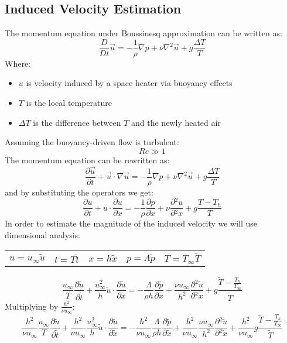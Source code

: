 \documentclass[11pt, a4paper]{article}
\newcommand{\parder}[2]{\frac{\partial {#1}}{\partial {#2}}}
\begin{document}
\subsection{Induced Velocity Estimation}
The momentum equation under Boussinesq approximation can be written as:
\begin{equation}
    \frac{D}{Dt}\vec{u}=-\frac{1}{\rho}\nabla p+\nu\nabla^2\vec{u}+g\frac{\Delta T}{T}
\end{equation}
Where:
\begin{itemize}
    \item $u$ is velocity induced by a space heater via buoyancy effects
    \item $T$ is the local temperature
    \item $\Delta T$ is the difference between $T$ and the newly heated air
\end{itemize}
Assuming the buoyancy-driven flow is turbulent:
\begin{equation*}
    Re\gg1
\end{equation*}
The momentum equation can be rewritten as:
\begin{equation*}
    \parder{\vec{u}}{t}+\vec{u}\cdot\nabla\vec{u}=-\frac{1}{\rho}\nabla p+\nu\nabla^2\vec{u}+g\frac{\Delta T}{T}
\end{equation*}
and by substituting the operators we get:
\begin{equation}
    \parder{u}{t}+u\cdot\parder{u}{x}=-\frac{1}{\rho}\parder{p}{x}+\nu\parder{^2u}{^2x}+g\frac{T-T_h}{T}
\end{equation}
In order to estimate the magnitude of the induced velocity we will use dimensional analysis:
\begin{table}[H]
    \center
    \begin{tabular}{c|c|c|c|c}
        $u=u_\infty\tilde{u}$ & $t=T\tilde{t}$ & $x=h\tilde{x}$ & $p=\Lambda\tilde{p}$ & $T=T_\infty\tilde{T}$
    \end{tabular}
\end{table}
\begin{equation}
    \frac{u_\infty}{T}\parder{\tilde{u}}{\tilde{t}}+\frac{u_\infty^2}{h}\tilde{u}\cdot\parder{\tilde{u}}{\tilde{x}}=-\frac{\Lambda}{\rho h}\parder{\tilde{p}}{\tilde{x}}+\frac{\nu u_\infty}{h^2}\parder{^2\tilde{u}}{^2\tilde{x}}+g\frac{\tilde{T}-\displaystyle\frac{T_h}{T_\infty}}{\tilde{T}}
\end{equation}
Multiplying by $\displaystyle\frac{h^2}{\nu u_\infty}$:
\begin{equation}
    \frac{h^2}{\nu u_\infty}\frac{u_\infty}{T}\parder{\tilde{u}}{\tilde{t}}+\frac{h^2}{\nu u_\infty}\frac{u_\infty^2}{h}\tilde{u}\cdot\parder{\tilde{u}}{\tilde{x}}=-\frac{h^2}{\nu u_\infty}\frac{\Lambda}{\rho h}\parder{\tilde{p}}{\tilde{x}}+\frac{h^2}{\nu u_\infty}\frac{\nu u_\infty}{h^2}\parder{^2\tilde{u}}{^2\tilde{x}}+\frac{h^2}{\nu u_\infty}g\frac{\tilde{T}-\displaystyle\frac{T_h}{T_\infty}}{\tilde{T}}
\end{equation}
\end{document}
